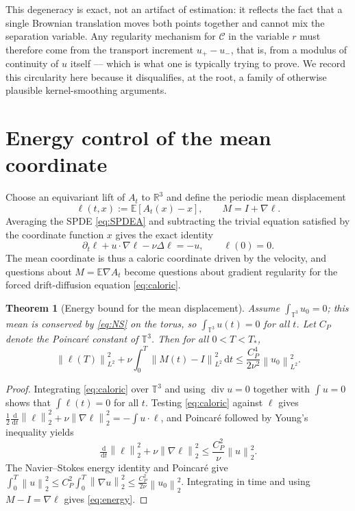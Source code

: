 \documentclass[11pt,reqno]{amsart}
\newcommand{\R}{\mathbb{R}}
\newcommand{\T}{\mathbb{T}}
\newcommand{\E}{\mathbb{E}}
\newcommand{\dd}{\,\mathrm{d}}
\newcommand{\norm}[1]{\left\lVert #1\right\rVert}
\DeclareMathOperator{\diver}{div}
\newtheorem{theorem}{Theorem}[section]
\theoremstyle{definition}
\begin{document}
This degeneracy is exact, not an artifact of estimation: it reflects the fact that a
single Brownian translation moves both points together and cannot mix the separation
variable. Any regularity mechanism for $\mathcal C$ in the variable $r$ must therefore come
from the transport increment $u_+-u_-$, that is, from a modulus of continuity of $u$
itself --- which is what one is typically trying to prove. We record this circularity here
because it disqualifies, at the root, a family of otherwise plausible kernel-smoothing
arguments.

\section{Energy control of the mean coordinate}\label{sec:caloric}

Choose an equivariant lift of $A_t$ to $\R^3$ and define the periodic mean displacement
\[
  \ell(t,x):=\E[A_t(x)-x],\qquad M=I+\nabla\ell .
\]
Averaging the SPDE \eqref{eq:SPDEA} and subtracting the trivial equation satisfied by the
coordinate function $x$ gives the exact identity
\begin{equation}\label{eq:caloric}
  \partial_t\ell+u\cdot\nabla\ell-\nu\Delta\ell=-u,\qquad \ell(0)=0 .
\end{equation}
The mean coordinate is thus a caloric coordinate driven by the velocity, and questions
about $M=\E\nabla A_t$ become questions about gradient regularity for the forced
drift-diffusion equation \eqref{eq:caloric}.

\begin{theorem}[Energy bound for the mean displacement]\label{thm:energy}
Assume $\int_{\T^3}u_0=0$; this mean is conserved by \eqref{eq:NS} on the torus, so
$\int_{\T^3}u(t)=0$ for all $t$. Let $C_P$ denote the Poincar\'e constant of $\T^3$. Then
for all $0<T<T_*$,
\begin{equation}\label{eq:energy}
  \norm{\ell(T)}_{L^2}^2+\nu\int_0^T\norm{M(t)-I}_{L^2}^2\dd t
  \le\frac{C_P^4}{2\nu^2}\norm{u_0}_{L^2}^2 .
\end{equation}
\end{theorem}

\begin{proof}
Integrating \eqref{eq:caloric} over $\T^3$ and using $\diver u=0$ together with
$\int u=0$ shows that $\int\ell(t)=0$ for all $t$. Testing \eqref{eq:caloric} against
$\ell$ gives
$\tfrac12\tfrac{\dd}{\dd t}\norm\ell_2^2+\nu\norm{\nabla\ell}_2^2=-\int u\cdot\ell$, and
Poincar\'e followed by Young's inequality yields
\[
  \tfrac{\dd}{\dd t}\norm\ell_2^2+\nu\norm{\nabla\ell}_2^2
  \le\frac{C_P^2}{\nu}\norm{u}_2^2 .
\]
The Navier--Stokes energy identity and Poincar\'e give
$\int_0^T\norm u_2^2\le C_P^2\int_0^T\norm{\nabla u}_2^2
\le\frac{C_P^2}{2\nu}\norm{u_0}_2^2$. Integrating in time and using
$M-I=\nabla\ell$ gives \eqref{eq:energy}.
\end{proof}
\end{document}
